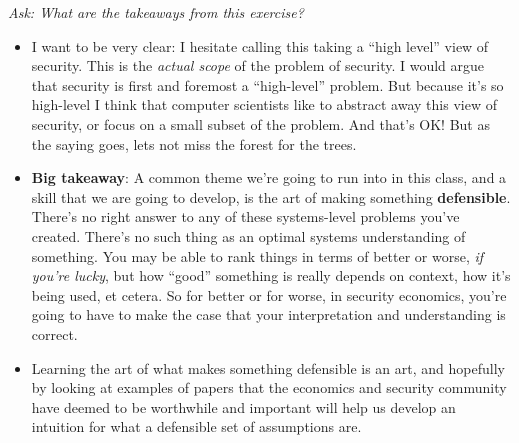 \documentclass[11pt]{article}
\begin{document}
{\it Ask: What are the takeaways from this exercise?}

\begin{itemize}
    \item I want to be very clear: I hesitate calling this taking a  ``high level'' view of security. This is the {\it actual scope} of the problem of security.  I would argue that security is first and foremost a ``high-level'' problem. But because it's so high-level I think that computer scientists like to abstract away this view of security, or focus on a small subset of the problem. And that's OK! But as the saying goes, lets not miss the forest for the trees.
    \item {\bf Big takeaway}: A common theme we're going to run into in this class, and a skill that we are going to develop, is the art of making something {\bf defensible}. There's no right answer to any of these systems-level problems you've created. There's no such thing as an optimal systems understanding of something. You may be able to rank things in terms of better or worse, {\it if you're lucky}, but how ``good'' something is really depends on context, how it's being used, et cetera. So for better or for worse, in security economics, you're going to have to make the case that your interpretation and understanding is correct. 
    \item Learning the art of what makes something defensible is an art, and hopefully by looking at examples of papers that the economics and security community have deemed to be worthwhile and important will help us develop an intuition for what a defensible set of assumptions are. 
\end{itemize}
\end{document}
